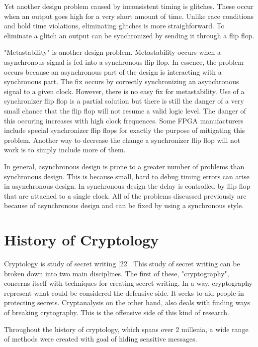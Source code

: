 \documentclass{article}
\begin{document}
    Yet another design problem caused by inconsistent timing is glitches. These occur
    when an output goes high for a very short amount of time. Unlike race conditions
    and hold time violations, eliminating glitches is more straighforward.
    To eliminate a glitch an output can be synchronized by sending it through a flip flop.

    "Metastability" is another design problem. Metastability occurs when a asynchronous
    signal is fed into a synchronous flip flop. In essence, the problem occurs because
    an asynchronous part of the design is interacting with a synchronous part.
    The fix occurs by correctly synchronizing an asynchronous signal to a given clock.
    However, there is no easy fix for metastability. Use of a synchronizer flip flop
    is a partial solution but there is still the danger of a very small chance
    that the flip flop will not resume a valid logic level. The danger of this occuring
    increases with high clock frequences. Some FPGA manufacturers include special
    synchronizer flip flops for exactly the purpose of mitigating this problem.
    Another way to decrease the change a synchronizer flip flop will not work is
    to simply include more of them.

    In general, asynchronous design is prone to a greater number of problems
    than synchronous design. This is because small, hard to debug timing errors
    can arise in asynchronous design.
    In synchronous design the delay is controlled by flip flop that are attached
    to a single clock.
    All of the problems discussed previously are because of asynchronous design
    and can be fixed by using a synchronous style.

    \section{History of Cryptology}

    Cryptology is study of secret writing [22]. This study of secret writing
    can be broken down into two main disciplines.
    The first of these, "cryptography", concerns itself with techniques
    for creating secret writing. In a way, cryptography represent what could
    be considered the defensive side. It seeks to aid people in
    protecting secrets.
    Cryptanalysis on the other hand, also deals with finding ways of breaking
    crytography. This is the offensive side of this kind of research.

    Throughout the history of cryptology, which spans over 2 millenia,
    a wide range of methods were created with goal of hiding sensitive
    messages.
\end{document}
